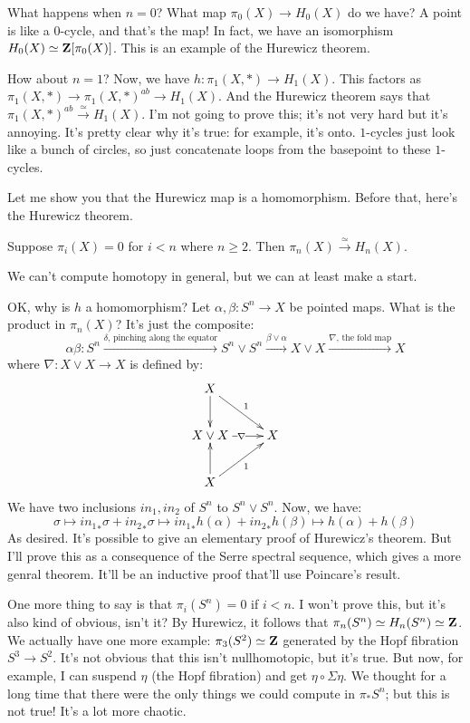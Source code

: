 What happens when $n=0$? What map $\pi_0(X)\to H_0(X)$ do we have? A point is like a $0$-cycle, and that's the map! In fact, we have an isomorphism $H_0(X)\simeq \mathbf Z[\pi_0(X)]$. This is an example of the Hurewicz theorem.

How about $n=1$? Now, we have $h:\pi_1(X,\ast)\to H_1(X)$. This factors as $\pi_1(X,\ast)\to \pi_1(X,\ast)^{ab}\to H_1(X)$. And the Hurewicz theorem says that $\pi_1(X,\ast)^{ab}\xrightarrow{\simeq} H_1(X)$. I'm not going to prove this; it's not very hard but it's annoying. It's pretty clear why it's true: for example, it's onto. $1$-cycles just look like a bunch of circles, so just concatenate loops from the basepoint to these $1$-cycles.

Let me show you that the Hurewicz map is a homomorphism. Before that, here's the Hurewicz theorem.
\begin{theorem}[Hurewicz]
    Suppose $\pi_i(X) = 0$ for $i<n$ where $n\geq 2$. Then $\pi_n(X)\xrightarrow{\simeq}H_n(X)$.
\end{theorem}
We can't compute homotopy in general, but we can at least make a start.

OK, why is $h$ a homomorphism? Let $\alpha,\beta:S^n\to X$ be pointed maps. What is the product in $\pi_n(X)$? It's just the composite:
$$\alpha\beta:S^n\xrightarrow{\delta\text{, pinching along the equator}} S^n\vee S^n\xrightarrow{\beta\vee\alpha}X\vee X\xrightarrow{\nabla\text{, the fold map}}X$$
where $\nabla:X\vee X\to X$ is defined by:
\begin{equation*}
    \xymatrix{
	X\ar[dr]^1\ar[d] & \\
	X\vee X\ar[r]|\nabla & X\\
	X\ar[u]\ar[ur]_1 & 
    }
\end{equation*}
We have two inclusions $in_1,in_2$ of $S^n$ to $S^n\vee S^n$. Now, we have:
$$\sigma\mapsto {in_1}_\ast\sigma + {in_2}_\ast\sigma\mapsto {in_1}_\ast h(\alpha) + {in_2}_\ast h(\beta)\mapsto h(\alpha) + h(\beta)$$
As desired. It's possible to give an elementary proof of Hurewicz's theorem. But I'll prove this as a consequence of the Serre spectral sequence, which gives a more genral theorem. It'll be an inductive proof that'll use Poincare's result.

One more thing to say is that $\pi_i(S^n) = 0$ if $i<n$. I won't prove this, but it's also kind of obvious, isn't it? By Hurewicz, it follows that $\pi_n(S^n)\simeq H_n(S^n)\simeq \mathbf Z$. We actually have one more example: $\pi_3(S^2)\simeq \mathbf Z$ generated by the Hopf fibration $S^3\to S^2$. It's not obvious that this isn't nullhomotopic, but it's true. But now, for example, I can suspend $\eta$ (the Hopf fibration) and get $\eta\circ\Sigma\eta$. We thought for a long time that there were the only things we could compute in $\pi_\ast S^n$; but this is not true! It's a lot more chaotic.
